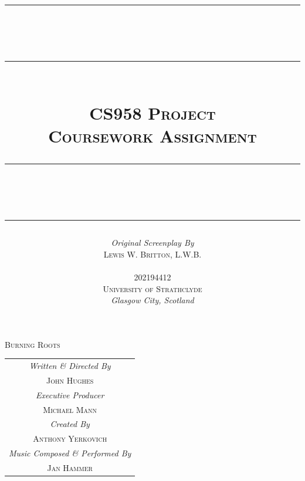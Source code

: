 \documentclass[11pt, english]{article}
\newcommand{\HRule}[1]{\rule{\linewidth}{#1}}
\begin{document}


	\title{
		\HRule{0.5pt}\\ [-0.9cm]
                \HRule{0.5pt}\\ [0.4cm]
                \huge\textsc{CS958 Project}\\
                \Large\textsc{Coursework Assignment}\\ [0.25cm]
		\HRule{0.5pt}\\ [-0.725cm]
                \HRule{0.5pt}
                }
	\author{
		\begin{tabular}{c}
			\textit{Original Screenplay By}\\
			\textsc{Lewis W. Britton, L.W.B.}\\
			\hline
			\hline
		\end{tabular}\\
                \textsc{202194412}\\
                \textsc{University of Strathclyde}\\
		\textit{Glasgow City, Scotland}
                }
	\date{}
	\maketitle

        \begin{center}
		\huge{\textsc{Burning Roots}}
        \end{center}

        \vspace{\fill}

	\begin{center}
	\begin{tabular}{c}
		\textit{Written \& Directed By}\\ \textsc{John Hughes}\\
		\hline
		\hline
		\textit{Executive Producer}\\ \textsc{Michael Mann}\\
		\hline
		\hline
		\textit{Created By}\\ \textsc{Anthony Yerkovich}\\
		\hline
		\hline
		\textit{Music Composed \& Performed By}\\ \textsc{Jan Hammer}\\
	\end{tabular}
	\end{center}

	\begin{center}
	\end{center}
\end{document}
